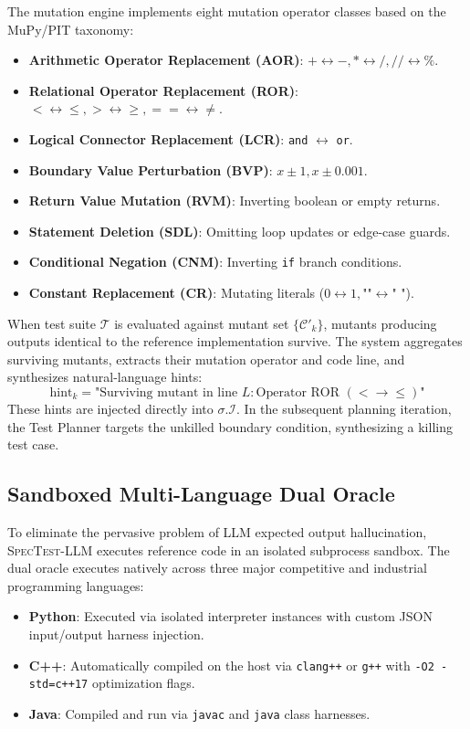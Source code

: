 \documentclass[conference]{IEEEtran}
\begin{document}
The mutation engine implements eight mutation operator classes based on the MuPy/PIT taxonomy:
\begin{itemize}
    \item \textbf{Arithmetic Operator Replacement (AOR)}: $+ \leftrightarrow -, * \leftrightarrow /, // \leftrightarrow \%$.
    \item \textbf{Relational Operator Replacement (ROR)}: $< \leftrightarrow \le, > \leftrightarrow \ge, == \leftrightarrow \neq$.
    \item \textbf{Logical Connector Replacement (LCR)}: \texttt{and} $\leftrightarrow$ \texttt{or}.
    \item \textbf{Boundary Value Perturbation (BVP)}: $x \pm 1, x \pm 0.001$.
    \item \textbf{Return Value Mutation (RVM)}: Inverting boolean or empty returns.
    \item \textbf{Statement Deletion (SDL)}: Omitting loop updates or edge-case guards.
    \item \textbf{Conditional Negation (CNM)}: Inverting \texttt{if} branch conditions.
    \item \textbf{Constant Replacement (CR)}: Mutating literals ($0 \leftrightarrow 1, \text{""} \leftrightarrow \text{" "}$).
\end{itemize}

When test suite $\mathcal{T}$ is evaluated against mutant set $\{\mathcal{C}'_k\}$, mutants producing outputs identical to the reference implementation survive. The system aggregates surviving mutants, extracts their mutation operator and code line, and synthesizes natural-language hints:
\begin{equation}
    \text{hint}_k = \text{"Surviving mutant in line } L: \text{Operator } \text{ROR } (< \to \le) \text{"}
\end{equation}
These hints are injected directly into $\sigma.\mathcal{I}$. In the subsequent planning iteration, the Test Planner targets the unkilled boundary condition, synthesizing a killing test case.

\subsection{Sandboxed Multi-Language Dual Oracle}
To eliminate the pervasive problem of LLM expected output hallucination, \textsc{SpecTest-LLM} executes reference code in an isolated subprocess sandbox. The dual oracle executes natively across three major competitive and industrial programming languages:
\begin{itemize}
    \item \textbf{Python}: Executed via isolated interpreter instances with custom JSON input/output harness injection.
    \item \textbf{C++}: Automatically compiled on the host via \texttt{clang++} or \texttt{g++} with \texttt{-O2 -std=c++17} optimization flags.
    \item \textbf{Java}: Compiled and run via \texttt{javac} and \texttt{java} class harnesses.
\end{itemize}
\end{document}
